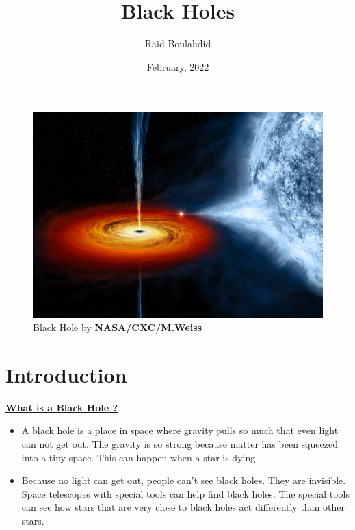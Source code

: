 \documentclass[15pt]{article}
\title{Black Holes}
\author{Raid Boulahdid}
\date{February, 2022}
\begin{document}
	\maketitle
	
	\begin{figure}[h]
		\centering
		\includegraphics[width=13cm]{blackHole}
		\caption{Black Hole by \textbf{NASA/CXC/M.Weiss}}
		\label{fig:blackHolePic}
	\end{figure}
	
	\pagebreak

	\tableofcontents
	
	\pagebreak

	\section{Introduction}

	\underline{\textbf{What is a Black Hole ? \cite{whatIsBlackHole}}}
	
	\begin{itemize}
		\item
		A black hole is a place in space where gravity pulls so much that even light can not get out. The gravity is so strong because matter has been squeezed into a tiny space. This can happen when a star is dying.
		
		\item
		Because no light can get out, people can't see black holes. They are invisible. Space telescopes with special tools can help find black holes. The special tools can see how stars that are very close to black holes act differently than other stars.
	\end{itemize}
\end{document}
